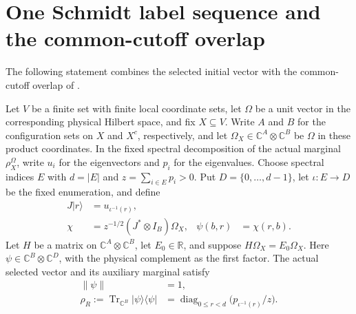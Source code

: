 \section{One Schmidt label sequence and the common-cutoff overlap}
\label{sec:schmidt_bell_common_cutoffs}

The following statement combines the selected initial vector with the
common-cutoff overlap of
\cite[Section~7, lines~130--147, 240--281 and 332--354]{OpenAI2026AreaLaw}.

\begin{theorem}
\label{thm:schmidt_bell_common_cutoffs}
\leanok
{}
Let $V$ be a finite set with finite local coordinate sets, let $\Omega$ be
a unit vector in the corresponding physical Hilbert space, and fix
$X\subseteq V$. Write $A$ and $B$ for the configuration sets on $X$ and
$X^c$, respectively, and let $\Omega_X\in\mathbb C^A\otimes\mathbb C^B$
be $\Omega$ in these product coordinates. In the fixed spectral
decomposition of the actual marginal $\rho_X^\Omega$, write $u_i$ for
the eigenvectors and $p_i$ for the eigenvalues. Choose spectral indices
$E$ with $d=|E|$ and $z=\sum_{i\in E}p_i>0$.
Put $D=\{0,\ldots,d-1\}$, let $\iota:E\to D$ be the fixed
enumeration, and define
\begin{align}
 J|r\rangle&=u_{\iota^{-1}(r)},\\
 \chi&=z^{-1/2}(J^*\otimes I_B)\Omega_X,
 &\psi(b,r)&=\chi(r,b).
\end{align}
Let $H$ be a matrix on $\mathbb C^A\otimes\mathbb C^B$, let
$E_0\in\mathbb R$, and suppose $H\Omega_X=E_0\Omega_X$.
Here $\psi\in\mathbb C^B\otimes\mathbb C^D$, with the physical
complement as the first factor. The actual selected vector and its
auxiliary marginal satisfy
\begin{align}
 \|\psi\|&=1,\\
 \rho_R:=\operatorname{Tr}_{\mathbb C^B}|\psi\rangle\langle\psi|
   &=\operatorname{diag}_{0\le r<d}\bigl(p_{\iota^{-1}(r)}/z\bigr).
\end{align}


\end{theorem}
